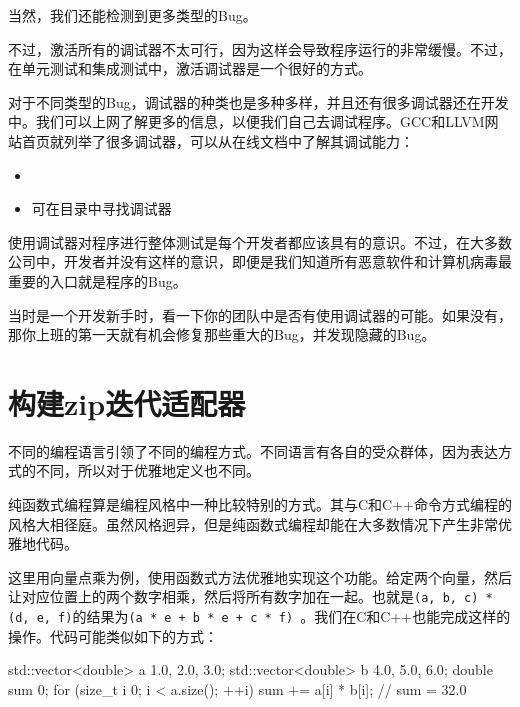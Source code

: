 当然，我们还能检测到更多类型的Bug。

不过，激活所有的调试器不太可行，因为这样会导致程序运行的非常缓慢。不过，在单元测试和集成测试中，激活调试器是一个很好的方式。


对于不同类型的Bug，调试器的种类也是多种多样，并且还有很多调试器还在开发中。我们可以上网了解更多的信息，以便我们自己去调试程序。GCC和LLVM网站首页就列举了很多调试器，可以从在线文档中了解其调试能力：

\begin{itemize}
\item {}

\item {} 可在目录中寻找调试器

\end{itemize}

使用调试器对程序进行整体测试是每个开发者都应该具有的意识。不过，在大多数公司中，开发者并没有这样的意识，即便是我们知道所有恶意软件和计算机病毒最重要的入口就是程序的Bug。

当时是一个开发新手时，看一下你的团队中是否有使用调试器的可能。如果没有，那你上班的第一天就有机会修复那些重大的Bug，并发现隐藏的Bug。


\section{构建zip迭代适配器}

不同的编程语言引领了不同的编程方式。不同语言有各自的受众群体，因为表达方式的不同，所以对于优雅地定义也不同。

纯函数式编程算是编程风格中一种比较特别的方式。其与C和C++命令方式编程的风格大相径庭。虽然风格迥异，但是纯函数式编程却能在大多数情况下产生非常优雅地代码。

这里用向量点乘为例，使用函数式方法优雅地实现这个功能。给定两个向量，然后让对应位置上的两个数字相乘，然后将所有数字加在一起。也就是\texttt{(a, b, c) * (d, e, f)}的结果为\texttt{(a * e + b * e + c * f) }。我们在C和C++也能完成这样的操作。代码可能类似如下的方式：

\begin{codebox}[cpp]
std::vector<double> a {1.0, 2.0, 3.0};
std::vector<double> b {4.0, 5.0, 6.0};
double sum {0};
for (size_t i {0}; i < a.size(); ++i) {
    sum += a[i] * b[i];
}
// sum = 32.0
\end{codebox}

